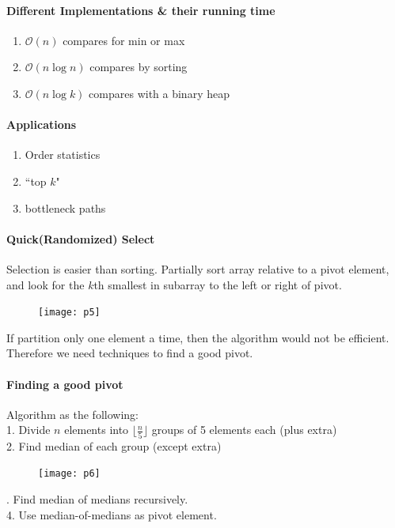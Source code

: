 \documentclass[11pt]{article}
\begin{document}
\paragraph{Different Implementations \& their running time}
\begin{enumerate}
	\item $\mathcal{O}(n)$ compares for min or max
	\item $\mathcal{O}(n \log n)$ compares by sorting
	\item $\mathcal{O}(n \log k)$ compares with a binary heap
\end{enumerate}

\paragraph{Applications}
\begin{enumerate}
	\item Order statistics
	\item ``top $k$"
	\item bottleneck paths
\end{enumerate}

\paragraph{Quick(Randomized) Select}
Selection is easier than sorting.
Partially sort array relative to a pivot element, and look for the $k$th smallest in subarray to the left or right of pivot.
\begin{figure}[h]
	\centering
	\texttt{[image: p5]}
\end{figure}
If partition only one element a time, then the algorithm would not be efficient. Therefore we need techniques to find a good pivot.

\paragraph{Finding a good pivot}
Algorithm as the following: \\
1. Divide $n$ elements into $\lfloor \frac{n}{5} \rfloor$ groups of 5 elements each (plus extra)\\
2. Find median of each group (except extra) 
\begin{figure}[h]
	\centering
	\texttt{[image: p6]}
\end{figure}

. Find median of medians recursively. \\
4. Use median-of-medians as pivot element.\\
\end{document}
